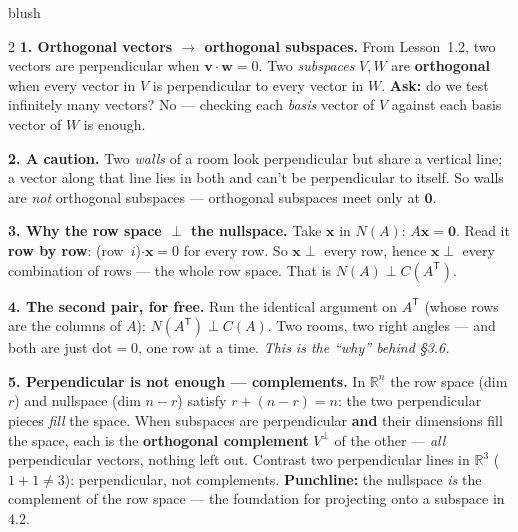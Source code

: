 \documentclass[10pt]{article}
\newcommand{\vv}{\mathbf{v}}
\newcommand{\ww}{\mathbf{w}}
\newcommand{\xx}{\mathbf{x}}
\newcommand{\zero}{\mathbf{0}}
\newcommand{\T}{\mathsf{T}}
\begin{document}
\begin{skillbox}[Lesson]{blush}
\begin{multicols}{2}
\textbf{1. Orthogonal vectors $\to$ orthogonal subspaces.} From Lesson~1.2, two vectors are
perpendicular when $\vv\cdot\ww=0$. Two \emph{subspaces} $V,W$ are \textbf{orthogonal} when every
vector in $V$ is perpendicular to every vector in $W$. \textbf{Ask:} do we test infinitely many
vectors? No --- checking each \emph{basis} vector of $V$ against each basis vector of $W$ is enough.

\textbf{2. A caution.} Two \emph{walls} of a room look perpendicular but share a vertical line; a
vector along that line lies in both and can't be perpendicular to itself. So walls are \emph{not}
orthogonal subspaces --- orthogonal subspaces meet only at $\zero$.

\textbf{3. Why the row space $\perp$ the nullspace.} Take $\xx$ in $N(A)$: $A\xx=\zero$. Read it
\textbf{row by row}: (row~$i$)$\cdot\xx=0$ for every row. So $\xx\perp$ every row, hence $\xx\perp$
every combination of rows --- the whole row space. That is $N(A)\perp C(A^{\T})$.

\columnbreak

\textbf{4. The second pair, for free.} Run the identical argument on $A^{\T}$ (whose rows are the
columns of $A$): $N(A^{\T})\perp C(A)$. Two rooms, two right angles --- and both are just
$\text{dot}=0$, one row at a time. \emph{This is the ``why'' behind §3.6.}

\textbf{5. Perpendicular is not enough --- complements.} In $\mathbb{R}^n$ the row space (dim $r$) and
nullspace (dim $n-r$) satisfy $r+(n-r)=n$: the two perpendicular pieces \emph{fill} the space. When
subspaces are perpendicular \textbf{and} their dimensions fill the space, each is the
\textbf{orthogonal complement} $V^{\perp}$ of the other --- \emph{all} perpendicular vectors, nothing
left out. Contrast two perpendicular lines in $\mathbb{R}^3$ ($1+1\neq 3$): perpendicular, not
complements. \textbf{Punchline:} the nullspace \emph{is} the complement of the row space --- the
foundation for projecting onto a subspace in 4.2.
\end{multicols}
\end{skillbox}
\end{document}
